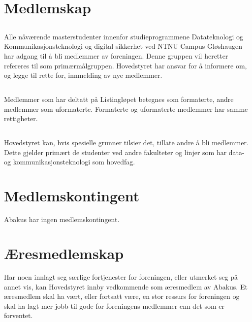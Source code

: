 \section{Medlemskap}

\subsection{}
Alle nåværende masterstudenter innenfor studieprogrammene Datateknologi og Kommunikasjonsteknologi
og digital sikkerhet ved NTNU Campus Gløshaugen har adgang til å bli medlemmer av foreningen.
Denne gruppen vil heretter refereres til som primærmålgruppen. Hovedstyret har ansvar
for å informere om, og legge til rette for, innmelding av nye medlemmer.

\subsection{}
Medlemmer som har deltatt på Listingløpet betegnes som formaterte, andre
medlemmer som uformaterte. Formaterte og uformaterte medlemmer har samme
rettigheter.

\subsection{}
Hovedstyret kan, hvis spesielle grunner tilsier det, tillate andre å bli
medlemmer. Dette gjelder primært de studenter ved andre fakulteter og linjer
som har data- og kommunikasjonsteknologi som hovedfag.

\section{Medlemskontingent}
Abakus har ingen medlemskontingent.

\section{Æresmedlemskap}
Har noen innlagt seg særlige fortjenester for foreningen, eller utmerket seg
på annet vis, kan Hovedstyret innby vedkommende som æresmedlem av Abakus. Et
æresmedlem skal ha vært, eller fortsatt være, en stor ressurs for foreningen og
skal ha lagt mer jobb til gode for foreningens medlemmer enn det som er forventet.
